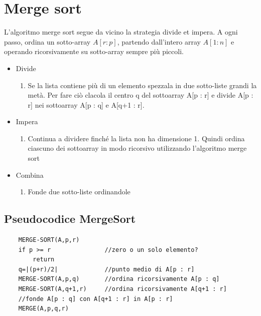 \section{Merge sort}
L'algoritmo merge sort segue da vicino la strategia divide et impera. A ogni passo, ordina un sotto-array $A[r : p]$, partendo dall'intero array $A[1: n]$ e operando ricorsivamente su sotto-array sempre più piccoli.
\begin{itemize}
    \item Divide
    \begin{enumerate}
        \item Se la lista contiene più di un elemento spezzala in due sotto-liste grandi la metà. Per fare ciò clacola il centro q del sottoarray A[p : r] e divide A[p : r] nei sottoarray A[p : q] e A[q+1 : r].
    \end{enumerate}
    \item Impera
    \begin{enumerate}
        \item Continua a dividere finché la lista non ha dimensione 1. Quindi ordina ciascuno dei sottoarray in modo ricorsivo utilizzando l'algoritmo merge sort
    \end{enumerate}
    \item Combina
    \begin{enumerate}
        \item Fonde due sotto-liste ordinandole
    \end{enumerate}
\end{itemize}

\vspace{1cm}

\noindent \subsection{Pseudocodice MergeSort}
\begin{verbatim}
    MERGE-SORT(A,p,r)
    if p >= r               //zero o un solo elemento?
        return
    q=|(p+r)/2|             //punto medio di A[p : r]
    MERGE-SORT(A,p,q)       //ordina ricorsivamente A[p : q]
    MERGE-SORT(A,q+1,r)     //ordina ricorsivamente A[q+1 : r]
    //fonde A[p : q] con A[q+1 : r] in A[p : r]
    MERGE(A,p,q,r)
\end{verbatim}

